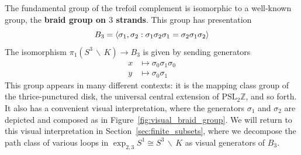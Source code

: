 \documentclass[12pt,twoside]{reedthesis}
\theoremstyle{definition}
\newcommand{\Z}{\mathbb{Z}}
\newcommand{\PSLZ}{\mathrm{PSL}_2{\Z}}
\newcommand{\wo}{\, \backslash \,}
\newcommand{\defnphrase}[1]{\textbf{#1}}
\DeclarePairedDelimiter\ang{\langle}{\rangle}
\begin{document}
The fundamental group of the trefoil complement is isomorphic to a well-known group, the \defnphrase{braid group on $3$ strands}.
This group has presentation
\begin{equation*}
  B_3 = \ang{\sigma_1, \sigma_2 : \sigma_1 \sigma_2 \sigma_1 = \sigma_2 \sigma_1 \sigma_2}
\end{equation*}
The isomorphism $\pi_1(S^3 \wo K) \to B_3$ is given by sending generators
\begin{equation}\label{eq:iso_pi1_b3}
  \begin{aligned}
    x &\mapsto \sigma_0 \sigma_1 \sigma_0 \\
    y &\mapsto \sigma_0 \sigma_1
  \end{aligned}
\end{equation}
This group appears in many different contexts: it is the mapping class group of the thrice-punctured disk, the universal central extension of $\PSLZ$, and so forth.
It also has a convenient visual interpretation, where the generators $\sigma_1$ and $\sigma_2$ are depicted and composed as in Figure~\ref{fig:visual_braid_group}.
We will return to this visual interpretation in Section~\ref{sec:finite_subsets}, where we decompose the path class of various loops in $\exp_{2,3} S^1 \cong S^3 \wo K$ as visual generators of $B_3$. 
\end{document}
